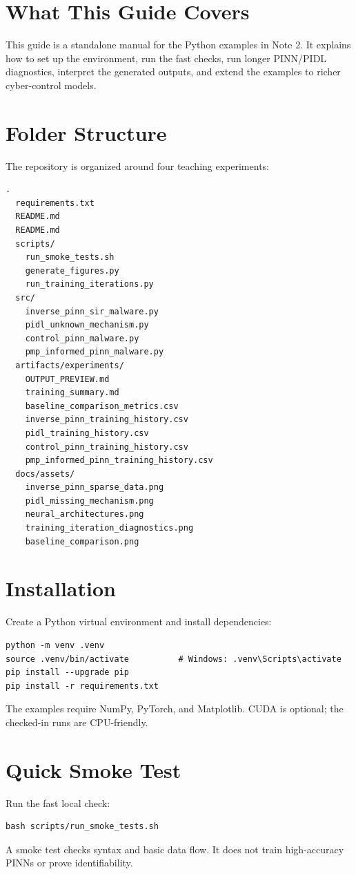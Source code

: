 \documentclass[11pt,a4paper]{article}
\begin{document}
\tableofcontents
\newpage
{}

\section{What This Guide Covers}
This guide is a standalone manual for the Python examples in Note 2. It explains how to set up the environment, run the fast checks, run longer PINN/PIDL diagnostics, interpret the generated outputs, and extend the examples to richer cyber-control models.

\section{Folder Structure}
The repository is organized around four teaching experiments:
\begin{verbatim}
.
  requirements.txt
  README.md
  README.md
  scripts/
    run_smoke_tests.sh
    generate_figures.py
    run_training_iterations.py
  src/
    inverse_pinn_sir_malware.py
    pidl_unknown_mechanism.py
    control_pinn_malware.py
    pmp_informed_pinn_malware.py
  artifacts/experiments/
    OUTPUT_PREVIEW.md
    training_summary.md
    baseline_comparison_metrics.csv
    inverse_pinn_training_history.csv
    pidl_training_history.csv
    control_pinn_training_history.csv
    pmp_informed_pinn_training_history.csv
  docs/assets/
    inverse_pinn_sparse_data.png
    pidl_missing_mechanism.png
    neural_architectures.png
    training_iteration_diagnostics.png
    baseline_comparison.png
\end{verbatim}

\section{Installation}
Create a Python virtual environment and install dependencies:
\begin{lstlisting}[style=pythonstyle]
python -m venv .venv
source .venv/bin/activate          # Windows: .venv\Scripts\activate
pip install --upgrade pip
pip install -r requirements.txt
\end{lstlisting}
The examples require NumPy, PyTorch, and Matplotlib. CUDA is optional; the checked-in runs are CPU-friendly.

\section{Quick Smoke Test}
Run the fast local check:
\begin{lstlisting}[style=pythonstyle]
bash scripts/run_smoke_tests.sh
\end{lstlisting}
A smoke test checks syntax and basic data flow. It does not train high-accuracy PINNs or prove identifiability.
\end{document}
